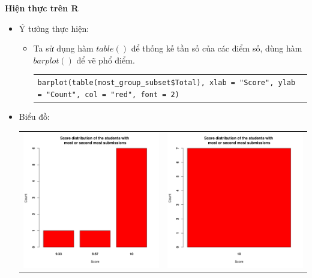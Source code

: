 \documentclass[a4paper]{article}
\theoremstyle{definition}
\begin{document}
\begin{enumerate}[a)]
\begin{itemize}
\begin{itemize}
        \end{itemize}
    \end{itemize}
    \bf Hiện thực trên R\normalfont
    \begin{itemize}
        \item Ý tưởng thực hiện:
        \begin{itemize}
            \item Ta sử dụng hàm $table()$ để thống kế tần số của các điểm số, dùng hàm $barplot()$ để vẽ phổ điểm.
            \begin{center}
                \begin{tabular}{p{13cm}}
                    \texttt{barplot(table(most\_group\_subset\$Total), xlab = "Score", ylab = "Count", col = "red", font = 2)}
                \end{tabular}
            \end{center}
        \end{itemize}
        \item Biểu đồ:\\
        \begin{center}
            \begin{tabular}{c c}
                 \includegraphics[width = 6.9cm]{Images/img3-4-1.png} & \includegraphics[width = 6.9cm]{Images/img3-4-2.png} \\

\end{tabular}
\end{center}
\end{itemize}
\end{enumerate}
\end{document}
